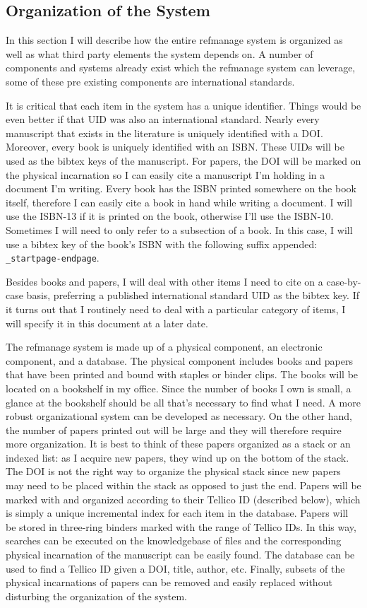 \documentclass[letterpaper,12pt]{article}
\begin{document}
\subsection{Organization of the System}
In this section I will describe how the entire refmanage system is organized as well as what third party elements the system depends on. A number of components and systems already exist which the refmanage system can leverage, some of these pre existing components are international standards. 

It is critical that each item in the system has a unique identifier. Things would be even better if that UID was also an international standard. Nearly every manuscript that exists in the literature is uniquely identified with a DOI. Moreover, every book is uniquely identified with an ISBN. These UIDs will be used as the bibtex keys of the manuscript. For papers, the DOI will be marked on the physical incarnation so I can easily cite a manuscript I'm holding in a document I'm writing. Every book has the ISBN printed somewhere on the book itself, therefore I can easily cite a book in hand while writing a document. I will use the ISBN-13 if it is printed on the book, otherwise I'll use the ISBN-10. Sometimes I will need to only refer to a subsection of a book. In this case, I will use a bibtex key of the book's ISBN with the following suffix appended: \verb|_startpage-endpage|. 

Besides books and papers, I will deal with other items I need to cite on a case-by-case basis, preferring a published international standard UID as the bibtex key. If it turns out that I routinely need to deal with a particular category of items, I will specify it in this document at a later date.

The refmanage system is made up of a physical component, an electronic component, and a database. The physical component includes books and papers that have been printed and bound with staples or binder clips. The books will be located on a bookshelf in my office. Since the number of books I own is small, a glance at the bookshelf should be all that's necessary to find what I need. A more robust organizational system can be developed as necessary. On the other hand, the number of papers printed out will be large and they will therefore require more organization. It is best to think of these papers organized as a stack or an indexed list: as I acquire new papers, they wind up on the bottom of the stack. The DOI is not the right way to organize the physical stack since new papers may need to be placed within the stack as opposed to just the end. Papers will be marked with and organized according to their Tellico ID (described below), which is simply a unique incremental index for each item in the database. Papers will be stored in three-ring binders marked with the range of Tellico IDs. In this way, searches can be executed on the knowledgebase of files and the corresponding physical incarnation of the manuscript can be easily found. The database can be used to find a Tellico ID given a DOI, title, author, etc. Finally, subsets of the physical incarnations of papers can be removed and easily replaced without disturbing the organization of the system.
\end{document}
